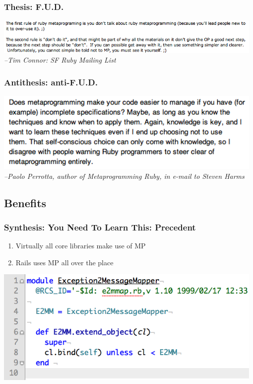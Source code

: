 \documentclass[slidestop,compress,mathserif,notes]{beamer}
\begin{document}
\begin{frame}
	\frametitle{Thesis:  F.U.D.}
		\includegraphics[width=0.98\textwidth, height=0.25\textheight]{img/tim_hates_mp.png}		
		\vskip 0.5cm
		\emph{--Tim Connor:  SF Ruby Mailing List}
\end{frame}

\begin{frame}
	\frametitle{Antithesis:  anti-F.U.D.}
	\includegraphics[width=0.98\textwidth, height=0.45\textheight]{img/paolo_anti_fud.png}		
	\vskip 0.5cm
	\emph{--Paolo Perrotta, author of Metaprogramming Ruby, in e-mail to Steven Harms}
\end{frame}

\subsection{Benefits} %
\label{sub:benefits}

\begin{frame}
	\frametitle{Synthesis:  You Need To Learn This:  Precedent}
	\begin{enumerate}
		\item Virtually all core libraries make use of MP
		\item Rails uses MP all over the place
	\end{enumerate}
	\includegraphics[scale=0.45, width=0.98\textwidth]{img/e2mmap.png}
\end{frame}
\end{document}
